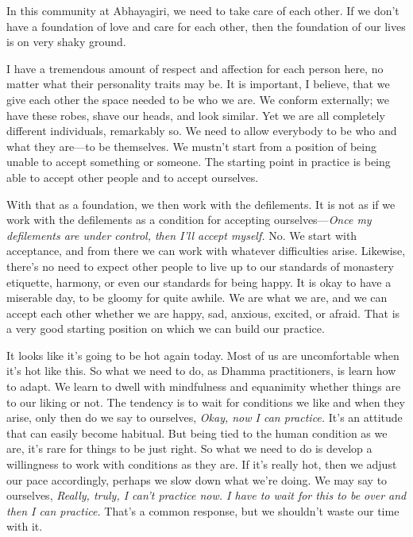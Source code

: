 In this community at Abhayagiri, we need to take care of each other. If 
we don't have a foundation of love and care for each other, then the 
foundation of our lives is on very shaky ground.

I have a tremendous amount of respect and affection for each person 
here, no matter what their personality traits may be. It is important, 
I believe, that we give each other the space needed to be who we are. 
We conform externally; we have these robes, shave our heads, and look 
similar. Yet we are all completely different individuals, remarkably 
so. We need to allow everybody to be who and what they are---to be 
themselves. We mustn't start from a position of being unable to accept 
something or someone. The starting point in practice is being able to 
accept other people and to accept ourselves.

With that as a foundation, we then work with the defilements. It is not 
as if we work with the defilements as a condition for accepting 
ourselves---\emph{Once my defilements are under control, then I'll 
accept myself.} No. We start with acceptance, and from there we can 
work with whatever difficulties arise. Likewise, there's no need to 
expect other people to live up to our standards of monastery etiquette, 
harmony, or even our standards for being happy. It is okay to have a 
miserable day, to be gloomy for quite awhile. We are what we are, and 
we can accept each other whether we are happy, sad, anxious, excited, 
or afraid. That is a very good starting position on which we can build 
our practice.


It looks like it's going to be hot again today. Most of us are 
uncomfortable when it's hot like this. So what we need to do, as Dhamma 
practitioners, is learn how to adapt. We learn to dwell with 
mindfulness and equanimity whether things are to our liking or not. The 
tendency is to wait for conditions we like and when they arise, only 
then do we say to ourselves, \emph{Okay, now I can practice.} It's an 
attitude that can easily become habitual. But being tied to the human 
condition as we are, it's rare for things to be just right. So what we 
need to do is develop a willingness to work with conditions as they 
are. If it's really hot, then we adjust our pace accordingly, perhaps 
we slow down what we're doing. We may say to ourselves, \emph{Really, 
truly, I can't practice now. I have to wait for this to be over and 
then I can practice.} That's a common response, but we shouldn't waste 
our time with it.

